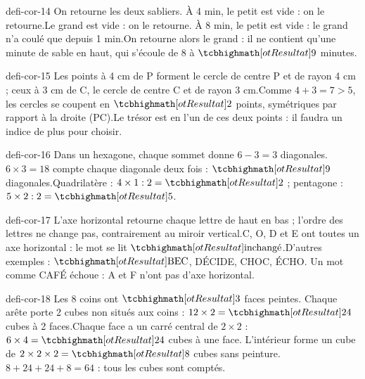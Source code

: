 \begin{blocEdition}{defi-cor-14}
On retourne les deux sabliers. À 4 min, le petit est vide : on le retourne.Le grand est vide : on le retourne. À 8 min, le petit est vide : le grand n’a coulé que depuis 1 min.On retourne alors le grand : il ne contient qu’une minute de sable en haut, qui s’écoule de 8 à $\res{9}$ minutes.
\end{blocEdition}
\begin{blocEdition}{defi-cor-15}
Les points à 4 cm de P forment le cercle de centre P et de rayon 4 cm ; ceux à 3 cm de C, le cercle de centre C et de rayon 3 cm.Comme $4+3=7>5$, les cercles se coupent en $\res2$ points, symétriques par rapport à la droite (PC).Le trésor est en l’un de ces deux points : il faudra un indice de plus pour choisir.
\end{blocEdition}
\begin{blocEdition}{defi-cor-16}
Dans un hexagone, chaque sommet donne $6-3=3$ diagonales.$6\times3=18$ compte chaque diagonale deux fois : $\res9$ diagonales.Quadrilatère : $4\times1:2=\res2$ ; pentagone : $5\times2:2=\res5$.
\end{blocEdition}
\begin{blocEdition}{defi-cor-17}
L’axe horizontal retourne chaque lettre de haut en bas ; l’ordre des lettres ne change pas, contrairement au miroir vertical.C, O, D et E ont toutes un axe horizontal : le mot se lit $\res{\text{inchangé}}$.D’autres exemples : $\res{\text{BEC}}$, DÉCIDE, CHOC, ÉCHO. Un mot comme CAFÉ échoue : A et F n’ont pas d’axe horizontal.
\end{blocEdition}
\begin{blocEdition}{defi-cor-18}
Les 8 coins ont $\res3$ faces peintes. Chaque arête porte 2 cubes non situés aux coins : $12\times2=\res{24}$ cubes à 2 faces.Chaque face a un carré central de $2\times2$ : $6\times4=\res{24}$ cubes à une face. L’intérieur forme un cube de $2\times2\times2=\res8$ cubes sans peinture.$8+24+24+8=64$ : tous les cubes sont comptés.
\end{blocEdition}
